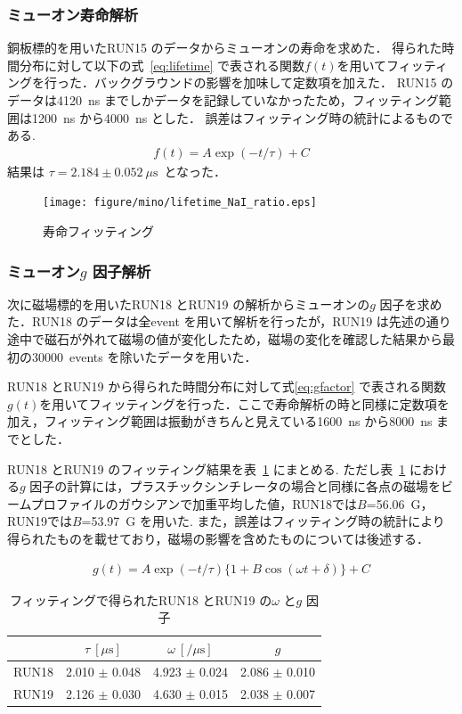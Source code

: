 \subsubsection{ミューオン寿命解析}
銅板標的を用いたRUN15 のデータからミューオンの寿命を求めた．
得られた時間分布に対して以下の式~\eqref{eq:lifetime} で表される関数$f(t)$を用いてフィッティングを行った．バックグラウンドの影響を加味して定数項を加えた．
RUN15 のデータは4120~ns までしかデータを記録していなかったため，フィッティング範囲は1200~ns から4000~ns とした．
誤差はフィッティング時の統計によるものである.
\begin{gather}
f(t) = A\exp(-t / \tau)+C \label{eq:lifetime}
\end{gather}
結果は $\tau = 2.184 \pm 0.052~\mu \mathrm{s}$~となった．
\begin{figure}[H]
\centering
\texttt{[image: figure/mino/lifetime\_NaI\_ratio.eps]}
\caption{寿命フィッティング}
\end{figure}


\subsubsection{ミューオン$g$ 因子解析}

次に磁場標的を用いたRUN18 とRUN19 の解析からミューオンの$g$ 因子を求めた．RUN18 のデータは全event を用いて解析を行ったが，RUN19 は先述の通り途中で磁石が外れて磁場の値が変化したため，磁場の変化を確認した結果から最初の30000~events を除いたデータを用いた．

RUN18 とRUN19 から得られた時間分布に対して式\eqref{eq:gfactor} で表される関数$g(t)$を用いてフィッティングを行った．ここで寿命解析の時と同様に定数項を加え，フィッティング範囲は振動がきちんと見えている1600~ns から8000~ns までとした．

RUN18 とRUN19 のフィッティング結果を表~\ref{tab:gfactor_result} にまとめる.
ただし表~\ref{tab:gfactor_result} における$g$ 因子の計算には，プラスチックシンチレータの場合と同様に各点の磁場をビームプロファイルのガウシアンで加重平均した値，RUN18では$B$=56.06~G，RUN19では$B$=53.97~G を用いた.
また，誤差はフィッティング時の統計により得られたものを載せており，磁場の影響を含めたものについては後述する．

\begin{gather}
g(t) = A\exp(-t / \tau)\{1+B\cos(\omega t+\delta)\}+C\label{eq:gfactor}
\end{gather}
\begin{table}[H]
\caption{フィッティングで得られたRUN18 とRUN19 の$\omega$ と$g$ 因子}
\centering
\begin{tabular}{cccc}\toprule
{} & $\tau~[\mu \mathrm{s}]$ & $\omega~[/\mu \mathrm{s}]$ & $g$ \\ \midrule
RUN18 & 2.010 $\pm$ 0.048 & 4.923 $\pm$ 0.024 & 2.086 $\pm$ 0.010  \\
RUN19 & 2.126 $\pm$ 0.030 & 4.630 $\pm$ 0.015 & 2.038 $\pm$ 0.007 \\ \bottomrule
\end{tabular}
\label{tab:gfactor_result}
\end{table}

